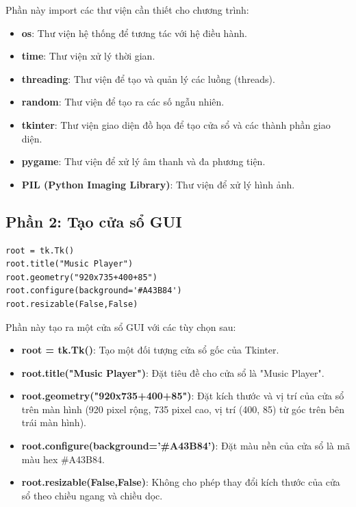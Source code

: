\documentclass[a4paper]{article}
\begin{document}
\begin{enumerate}
Phần này import các thư viện cần thiết cho chương trình:
\begin{itemize}
    \item \textbf{os}: Thư viện hệ thống để tương tác với hệ điều hành.
    \item \textbf{time}: Thư viện xử lý thời gian.
    \item \textbf{threading}: Thư viện để tạo và quản lý các luồng (threads).
    \item \textbf{random}: Thư viện để tạo ra các số ngẫu nhiên.
    \item \textbf{tkinter}: Thư viện giao diện đồ họa để tạo cửa sổ và các thành phần giao diện.
    \item \textbf{pygame}: Thư viện để xử lý âm thanh và đa phương tiện.
    \item \textbf{PIL (Python Imaging Library)}: Thư viện để xử lý hình ảnh.
\end{itemize}

\subsection{Phần 2: Tạo cửa sổ GUI}
\begin{mdframed}[hidealllines=true,backgroundcolor=magenta!10]
\begin{lstlisting}
root = tk.Tk()
root.title("Music Player")
root.geometry("920x735+400+85")
root.configure(background='#A43B84')
root.resizable(False,False)
\end{lstlisting}
\end{mdframed}
Phần này tạo ra một cửa sổ GUI với các tùy chọn sau:
\begin{itemize}
   \item \textbf{root = tk.Tk()}: Tạo một đối tượng cửa sổ gốc của Tkinter.
   \item \textbf{root.title("Music Player")}: Đặt tiêu đề cho cửa sổ là "Music Player".
   \item \textbf{root.geometry("920x735+400+85")}: Đặt kích thước và vị trí của cửa sổ trên màn hình (920 pixel rộng, 735 pixel cao, vị trí (400, 85) từ góc trên bên trái màn hình).
   \item \textbf{root.configure(background='#A43B84')}: Đặt màu nền của cửa sổ là mã màu hex #A43B84.
   \item \textbf{root.resizable(False,False)}: Không cho phép thay đổi kích thước của cửa sổ theo chiều ngang và chiều dọc.
\end{itemize}


\end{enumerate}
\end{document}
